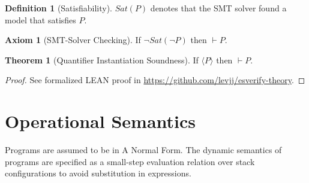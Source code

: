 \documentclass[10pt]{article}
\theoremstyle{definition}
\newtheorem{axiom}{Axiom}
\newtheorem{definition}{Definition}
\newtheorem{theorem}{Theorem}
\begin{document}
\begin{definition}[Satisfiability] 
  $Sat(P)$ denotes that the SMT solver found a model that satisfies $P$.
\end{definition}

\begin{axiom}[SMT-Solver Checking]
    If $\neg Sat(\neg P)$ then $\vdash P$.
\end{axiom}

\begin{theorem}[Quantifier Instantiation Soundness]
  If $\langle P \rangle$ then $\vdash P$.
\end{theorem}

\begin{proof}
  See formalized LEAN proof in \url{https://github.com/levjj/esverify-theory}.
\end{proof}

\newpage

\section{Operational Semantics}

Programs are assumed to be in A Normal Form. The dynamic semantics of programs are specified as a
small-step evaluation relation over stack configurations to avoid substitution in expressions.
\end{document}
